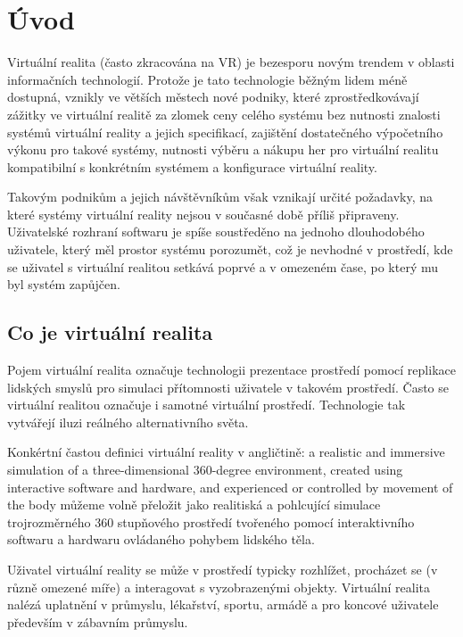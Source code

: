 \section{Úvod}\label{uxfavod}

Virtuální realita (často zkracována na VR) je bezesporu novým trendem v
oblasti informačních technologií. Protože je tato technologie běžným
lidem méně dostupná, vznikly ve větších městech nové podniky, které
zprostředkovávají zážitky ve virtuální realitě za zlomek ceny celého
systému bez nutnosti znalosti systémů virtuální reality a jejich
specifikací, zajištění dostatečného výpočetního výkonu pro takové
systémy, nutnosti výběru a nákupu her pro virtuální realitu kompatibilní
s konkrétním systémem a konfigurace virtuální reality.

Takovým podnikům a jejich návštěvníkům však vznikají určité požadavky,
na které systémy virtuální reality nejsou v současné době příliš
připraveny. Uživatelské rozhraní softwaru je spíše soustředěno na
jednoho dlouhodobého uživatele, který měl prostor systému porozumět, což
je nevhodné v prostředí, kde se uživatel s virtuální realitou setkává
poprvé a v omezeném čase, po který mu byl systém zapůjčen.

\subsection{Co je virtuální
realita}\label{co-je-virtuuxe1lnuxed-realita}

Pojem virtuální realita označuje technologii prezentace prostředí pomocí
replikace lidských smyslů pro simulaci přítomnosti uživatele v takovém
prostředí. Často se virtuální realitou označuje i samotné virtuální
prostředí. Technologie tak vytvářejí iluzi reálného alternativního
světa.

Konkértní častou definici virtuální reality v angličtině: a realistic
and immersive simulation of a three-dimensional 360-degree environment,
created using interactive software and hardware, and experienced or
controlled by movement of the body můžeme volně přeložit jako
realitiská a pohlcující simulace trojrozměrného 360 stupňového
prostředí tvořeného pomocí interaktivního softwaru a hardwaru ovládaného
pohybem lidského těla.

Uživatel virtuální reality se může v prostředí typicky rozhlížet,
procházet se (v různě omezené míře) a interagovat s vyzobrazenými
objekty. Virtuální realita nalézá uplatnění v průmyslu, lékařství,
sportu, armádě a pro koncové uživatele především v zábavním průmyslu.


